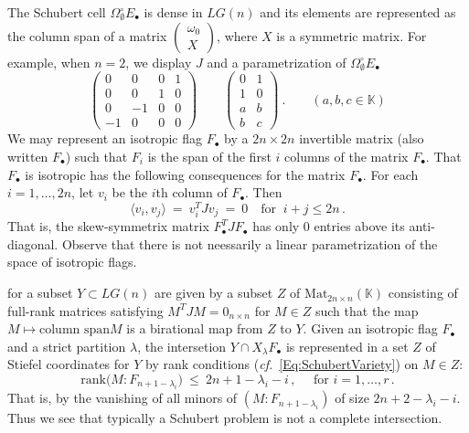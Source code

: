 \documentclass[12pt]{amsart}
\theoremstyle{remark}
\newcommand{\Mat}{\textrm{Mat}}
\newcommand{\Fdot}{F_\bullet}
\newcommand{\Edot}{E_\bullet}
\newcommand{\LG}{\textit{LG}}
\newcommand{\KK}{{\mathbb K}}
\newcommand{\defcolor}[1]{{\color{blue}#1}}
\newcommand{\demph}[1]{\defcolor{{\sl #1}}}
\begin{document}
The Schubert cell $\Omega^\circ_\emptyset \Edot$ is dense in $\LG(n)$ and its elements are represented as the column span
of a matrix $\left(\begin{smallmatrix}\omega_0\\X\end{smallmatrix}\right)$, where $X$ is a symmetric matrix.
For example, when $n=2$, we display $J$ and a parametrization of $\Omega^\circ_\emptyset \Edot$
\[
\left(\begin{matrix} 0& 0&0&1\\ 0& 0&1&0\\ 0&-1&0&0\\ -1& 0&0&0\end{matrix}\right)
  \qquad
  \left(\begin{matrix} 0&1\\ 1&0\\ a&b\\ b&c\end{matrix}\right)\ .
   \qquad (a,b,c\in\KK)
\]
We may represent an isotropic flag $\Fdot$ by a $2n\times 2n$ invertible matrix (also written $\Fdot$) such that $F_i$ is the span of
the first $i$ columns of the matrix $\Fdot$.
That $\Fdot$ is isotropic has the following consequences for the matrix $\Fdot$.
For each $i=1,\dotsc,2n$, let $v_i$ be the $i$th column of $\Fdot$.
Then
\[
\langle v_i, v_j\rangle \ =\ v_i^T J v_j\ =\ 0\quad\mbox{for }\ i+j\leq 2n\,.
\]
That is, the skew-symmetrix matrix $\Fdot^T J \Fdot$ has only 0 entries above its anti-diagonal.
Observe that there is not neessarily a linear parametrization of the space of isotropic flags.

\demph{Steifel coordinates} for a subset $Y\subset \LG(n)$ are given by a subset $Z$ of $\Mat_{2n\times n}(\KK)$ consisting
of full-rank matrices satisfying $M^T J M=0_{n\times n}$ for $M\in Z$ such that the map $M\mapsto \mbox{column span}M$ is a
birational map from $Z$ to $Y$.
Given an isotropic flag $\Fdot$ and a strict partition $\lambda$, the intersetion $Y\cap X_\lambda\Fdot$ is represented in
a set $Z$ of Stiefel coordinates for $Y$ by rank conditions ({\it cf.}~\eqref{Eq:SchubertVariety}) on $M\in Z$:
\[
\mbox{rank}\bigl( M\colon F_{n{+}1-\lambda_i} \bigr)\ \leq\ 2n{+}1{-}\lambda_i-i\,,\quad\mbox{ for } i=1,\dotsc,r\,.
\]
That is, by the vanishing of all minors of $(M\colon F_{n{+}1-\lambda_i})$ of size  $2n{+}2{-}\lambda_i-i$.
Thus we see that typically a Schubert problem is not a complete intersection.

\end{document}
